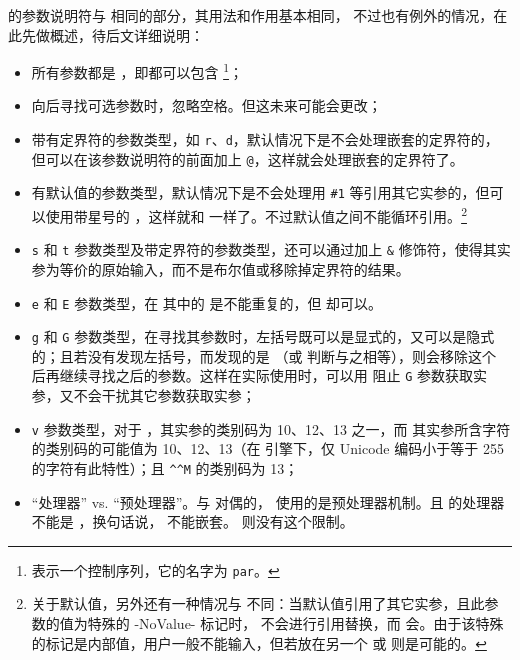 \documentclass[openany]{book}
\begin{document}
 的参数说明符与  相同的部分，其用法和作用基本相同，
不过也有例外的情况，在此先做概述，待后文详细说明：
\begin{itemize}
  \item 所有参数都是 ，即都可以包含 \footnote{ 表示一个控制序列，它的名字为 \texttt{par}。}；
  \item 向后寻找可选参数时，忽略空格。但这未来可能会更改；
  \item 带有定界符的参数类型，如 \texttt r、\texttt d，默认情况下是不会处理嵌套的定界符的，但可以在该参数说明符的前面加上 \texttt @，这样就会处理嵌套的定界符了。
  \item 有默认值的参数类型，默认情况下是不会处理用 \verb|#1| 等引用其它实参的，但可以使用带星号的 ，这样就和  一样了。不过默认值之间不能循环引用。\footnote{关于默认值，另外还有一种情况与  不同：当默认值引用了其它实参，且此参数的值为特殊的 -NoValue- 标记时， 不会进行引用替换，而  会。由于该特殊的标记是内部值，用户一般不能输入，但若放在另一个  或  则是可能的。}
  \item \texttt s 和 \texttt t 参数类型及带定界符的参数类型，还可以通过加上 \texttt\& 修饰符，使得其实参为等价的原始输入，而不是布尔值或移除掉定界符的结果。
  \item \texttt e 和 \texttt E 参数类型，在  其中的  是不能重复的，但  却可以。
  \item \texttt g 和 \texttt G 参数类型，在寻找其参数时，左括号既可以是显式的，又可以是隐式的；且若没有发现左括号，而发现的是 （或  判断与之相等），则会移除这个  后再继续寻找之后的参数。这样在实际使用时，可以用  阻止 \texttt G 参数获取实参，又不会干扰其它参数获取实参；
  \item \texttt{v} 参数类型，对于 ，其实参的类别码为 10、12、13 之一，而  其实参所含字符的类别码的可能值为 10、12、13（在 \pupTeX 引擎下，仅 Unicode 编码小于等于 255 的字符有此特性）；且 \texttt{\^{}\^{}M} 的类别码为 13；
  \item “处理器” vs. “预处理器”。与  对偶的， 使用的是预处理器机制。且  的处理器不能是 ，换句话说， 不能嵌套。 则没有这个限制。
\end{itemize}
\end{document}
